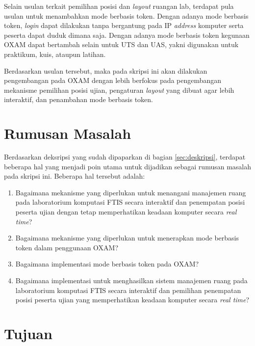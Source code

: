 \documentclass[a4paper,twoside]{article}
\begin{document}
Selain usulan terkait pemilihan posisi dan \textit{layout} ruangan lab, terdapat pula usulan untuk menambahkan mode berbasis token. Dengan adanya mode berbasis token, \textit{login} dapat dilakukan tanpa bergantung pada IP \textit{address} komputer serta peserta dapat duduk dimana saja. Dengan adanya mode berbasis token kegunaan OXAM dapat bertambah selain untuk UTS dan UAS, yakni digunakan untuk praktikum, kuis, ataupun latihan. 

Berdasarkan usulan tersebut, maka pada skripsi ini akan dilakukan pengembangan pada OXAM dengan lebih berfokus pada pengembangan mekanisme pemilihan posisi ujian, pengaturan \textit{layout} yang dibuat agar lebih interaktif, dan penambahan mode berbasis token. 

\vspace{-0.1cm}
\section{Rumusan Masalah}
\label{sec:rumusan}
Berdasarkan deksripsi yang sudah dipaparkan di bagian \ref{sec:deskripsi}, terdapat beberapa hal yang menjadi poin utama untuk dijadikan sebagai rumusan masalah pada skripsi ini. Beberapa hal tersebut adalah:
\begin{enumerate}
    \item Bagaimana mekanisme yang diperlukan untuk menangani manajemen ruang pada laboratorium komputasi FTIS secara interaktif dan penempatan posisi peserta ujian dengan tetap memperhatikan keadaan komputer secara \textit{real time}?
    \item Bagaimana mekanisme yang diperlukan untuk menerapkan mode berbasis token dalam penggunaan OXAM?
    \item Bagaimana implementasi mode berbasis token pada OXAM?
    \item Bagaimana implementasi untuk menghasilkan sistem manajemen ruang pada laboratorium komputasi FTIS secara interaktif dan pemilihan penempatan posisi peserta ujian yang memperhatikan keadaan komputer secara \textit{real time}?
\end{enumerate}

\section{Tujuan}
\end{document}
